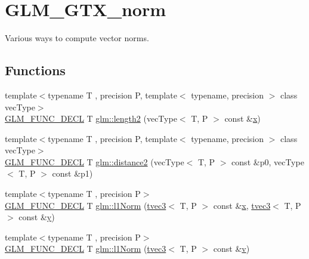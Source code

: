\hypertarget{group__gtx__norm}{}\section{G\+L\+M\+\_\+\+G\+T\+X\+\_\+norm}
\label{group__gtx__norm}


Various ways to compute vector norms.  


\subsection*{Functions}
\begin{DoxyCompactItemize}
\item 
{\footnotesize template$<$typename T , precision P, template$<$ typename, precision $>$ class vec\+Type$>$ }\\\mbox{\hyperlink{setup_8hpp_ab2d052de21a70539923e9bcbf6e83a51}{G\+L\+M\+\_\+\+F\+U\+N\+C\+\_\+\+D\+E\+CL}} T \mbox{\hyperlink{group__gtx__norm_ga6d326d62fd9b7f4f0a1b79e56492a7e4}{glm\+::length2}} (vec\+Type$<$ T, P $>$ const \&\mbox{\hyperlink{glad_8h_a92d0386e5c19fb81ea88c9f99644ab1d}{x}})
\item 
{\footnotesize template$<$typename T , precision P, template$<$ typename, precision $>$ class vec\+Type$>$ }\\\mbox{\hyperlink{setup_8hpp_ab2d052de21a70539923e9bcbf6e83a51}{G\+L\+M\+\_\+\+F\+U\+N\+C\+\_\+\+D\+E\+CL}} T \mbox{\hyperlink{group__gtx__norm_ga647d2602008801d6ed78f9708eb439cc}{glm\+::distance2}} (vec\+Type$<$ T, P $>$ const \&p0, vec\+Type$<$ T, P $>$ const \&p1)
\item 
{\footnotesize template$<$typename T , precision P$>$ }\\\mbox{\hyperlink{setup_8hpp_ab2d052de21a70539923e9bcbf6e83a51}{G\+L\+M\+\_\+\+F\+U\+N\+C\+\_\+\+D\+E\+CL}} T \mbox{\hyperlink{group__gtx__norm_gaebe5a39b06e262e615622129f37da4f4}{glm\+::l1\+Norm}} (\mbox{\hyperlink{structglm_1_1tvec3}{tvec3}}$<$ T, P $>$ const \&\mbox{\hyperlink{glad_8h_a92d0386e5c19fb81ea88c9f99644ab1d}{x}}, \mbox{\hyperlink{structglm_1_1tvec3}{tvec3}}$<$ T, P $>$ const \&\mbox{\hyperlink{glad_8h_a66ddd433d2cacfe27f5906b7e86faeed}{y}})
\item 
{\footnotesize template$<$typename T , precision P$>$ }\\\mbox{\hyperlink{setup_8hpp_ab2d052de21a70539923e9bcbf6e83a51}{G\+L\+M\+\_\+\+F\+U\+N\+C\+\_\+\+D\+E\+CL}} T \mbox{\hyperlink{group__gtx__norm_ga6d5964f09cdb43803496a5ee3ced71cb}{glm\+::l1\+Norm}} (\mbox{\hyperlink{structglm_1_1tvec3}{tvec3}}$<$ T, P $>$ const \&\mbox{\hyperlink{glad_8h_a14cfbe2fc2234f5504618905b69d1e06}{v}})

\end{DoxyCompactItemize}
